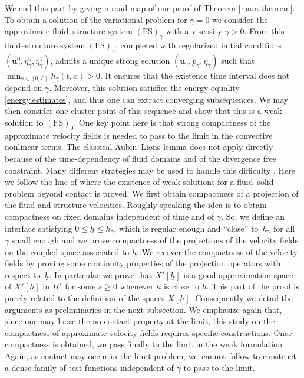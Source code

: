 \documentclass[10pt]{amsart}
\newcommand{\FS}{\mathrm{FS}}
\theoremstyle{remark}
\theoremstyle{definition}
\newcommand{\ug}{\boldsymbol{u}}
\begin{document}
We end this part by giving a road map of our proof of Theorem \ref{main.theorem}.
To obtain a solution of the variational problem for $\gamma=0$ we consider the approximate fluid--structure system $(\FS)_{\gamma}$ with a viscosity $\gamma>0$. From \cite[Th.\,1]{Grandmont-Hillairet-Lequeurre} this fluid--structure system $(\FS)_{\gamma}$, completed with regularized initial conditions $(\ug^{0}_{\gamma},\eta^{0}_{\gamma},\eta^{1}_{\gamma})$, admits a unique strong solution $(\ug_{\gamma},p_{\gamma},\eta_{\gamma})$ such that $\min_{x\in [0, L]}h_\gamma(t, x)>0$. It ensures that the existence time interval does not depend on $\gamma$. Moreover, this solution satisfies the energy equality \eqref{energy.estimates}, and thus one can extract converging subsequences. 
We may then consider one cluster point of this sequence and show that this is a weak solution to $(\FS)_0$.
One key point here is that strong compactness of the approximate velocity fields is needed to pass to the limit in the convective nonlinear terms. The classical Aubin--Lions lemma does not apply directly because of the time-dependency of fluid domains and of the divergence free constraint. Many different strategies may be used to handle this difficulty \cite{Fujita-Sauer, Grandmont08, Lengeler, Moussa}. Here we follow the line of \cite{SanMartin-Starovoitov-Tucsnak} where the existence of weak solutions for a fluid--solid problem beyond contact is proved. We first obtain compactness of a projection of the fluid and structure velocities. Roughly speaking the idea is to obtain compactness on fixed domains independent of time and of $\gamma$. So, we define an interface satisfying $0\leq\underline{h}\leq h_\gamma$, which is regular enough and ``close'' to~$h_\gamma$ for all $\gamma$ small enough
and we prove compactness of the projections of the velocity fields on the coupled space associated to $\underline{h}$. We recover the
compactness of the velocity fields by proving some continuity properties of the projection operators with respect to~$\underline{h}$. {In particular we prove that $X^{s}[\underline{h}]$ is a good approximation space of $X^{s}[h]$ in $H^s$ for some $s\geq 0$ whenever $\underline{h}$ is close to $h$.}
This part of the proof is purely related to the definition of the spaces $X[h]$. Consequently we detail the arguments as preliminaries in the next subsection. We emphasize again that, since one may loose the no contact property at the limit, this study on the compactness of approximate velocity fields requires specific constructions. Once compactness is obtained, we pass finally to the limit in the weak formulation. Again, as contact may occur in the limit problem, we~cannot follow \cite{Chambolle-etal} to construct a dense family of test functions independent of $\gamma$ to pass to the limit.
\end{document}

